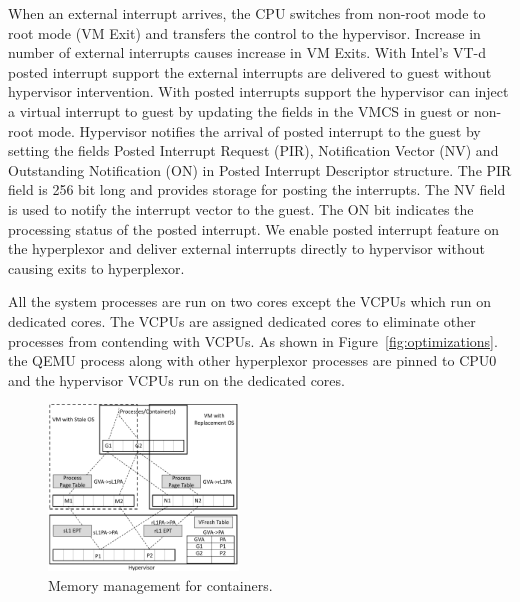      When an external interrupt arrives, the CPU switches from non-root mode to root mode (VM Exit) and transfers the control to the hypervisor. Increase in number of external interrupts causes increase in VM Exits. With Intel's VT-d posted interrupt support the external interrupts are delivered to guest without hypervisor intervention. With posted interrupts support the hypervisor can inject a virtual interrupt to guest by updating the fields in the VMCS in guest or non-root mode. Hypervisor notifies the arrival of posted interrupt to the guest by setting the fields Posted Interrupt Request (PIR), Notification Vector (NV) and Outstanding Notification (ON) in Posted Interrupt Descriptor structure. The PIR field is 256 bit long and provides storage for posting the interrupts. The NV field is used to notify the interrupt vector to the guest. The ON bit indicates the processing status of the posted interrupt. We enable posted interrupt feature on the hyperplexor and deliver external interrupts directly to hypervisor without causing exits to hyperplexor.  
     
All the system processes are run on two cores except the VCPUs which run on dedicated cores. The VCPUs are assigned dedicated cores to eliminate other processes from contending with VCPUs. As shown in Figure~\ref{fig:optimizations}. the QEMU process along with other hyperplexor processes are pinned to CPU0 and the hypervisor VCPUs run on the dedicated cores. 

\begin{figure}[t!]
 	  \includegraphics[width=0.45\textwidth]{figures/vfresh-table-container.pdf}
  \caption{Memory management for containers.}
  \label{fig:mappingc}
\end{figure}

